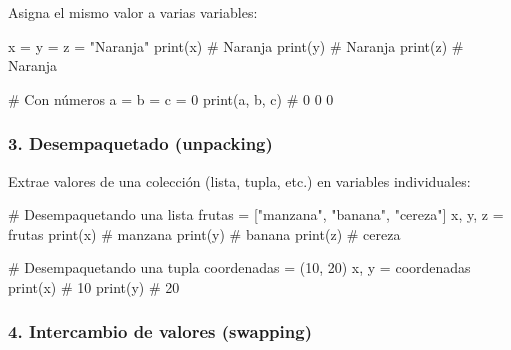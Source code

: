 \documentclass[
  doc,
  floatsintext,
  longtable,
  a4paper,
  nolmodern,
  notxfonts,
  notimes,
  12pt,
  colorlinks=true,linkcolor=blue,citecolor=blue,urlcolor=blue]{apa7}
\newenvironment{Shaded}{\begin{snugshade}}{\end{snugshade}}
\newcommand{\BuiltInTok}[1]{\textcolor[rgb]{0.00,0.23,0.31}{#1}}
\newcommand{\CommentTok}[1]{\textcolor[rgb]{0.37,0.37,0.37}{#1}}
\newcommand{\DecValTok}[1]{\textcolor[rgb]{0.68,0.00,0.00}{#1}}
\newcommand{\NormalTok}[1]{\textcolor[rgb]{0.00,0.23,0.31}{#1}}
\newcommand{\OperatorTok}[1]{\textcolor[rgb]{0.37,0.37,0.37}{#1}}
\newcommand{\StringTok}[1]{\textcolor[rgb]{0.13,0.47,0.30}{#1}}
\begin{document}
Asigna el mismo valor a varias variables:

\begin{Shaded}
\begin{Highlighting}[]
\NormalTok{x }\OperatorTok{=}\NormalTok{ y }\OperatorTok{=}\NormalTok{ z }\OperatorTok{=} \StringTok{"Naranja"}
\BuiltInTok{print}\NormalTok{(x)  }\CommentTok{\# Naranja}
\BuiltInTok{print}\NormalTok{(y)  }\CommentTok{\# Naranja}
\BuiltInTok{print}\NormalTok{(z)  }\CommentTok{\# Naranja}

\CommentTok{\# Con números}
\NormalTok{a }\OperatorTok{=}\NormalTok{ b }\OperatorTok{=}\NormalTok{ c }\OperatorTok{=} \DecValTok{0}
\BuiltInTok{print}\NormalTok{(a, b, c)  }\CommentTok{\# 0 0 0}
\end{Highlighting}
\end{Shaded}

\subsubsection{3. Desempaquetado
(unpacking)}\label{desempaquetado-unpacking}

Extrae valores de una colección (lista, tupla, etc.) en variables
individuales:

\begin{Shaded}
\begin{Highlighting}[]
\CommentTok{\# Desempaquetando una lista}
\NormalTok{frutas }\OperatorTok{=}\NormalTok{ [}\StringTok{"manzana"}\NormalTok{, }\StringTok{"banana"}\NormalTok{, }\StringTok{"cereza"}\NormalTok{]}
\NormalTok{x, y, z }\OperatorTok{=}\NormalTok{ frutas}
\BuiltInTok{print}\NormalTok{(x)  }\CommentTok{\# manzana}
\BuiltInTok{print}\NormalTok{(y)  }\CommentTok{\# banana}
\BuiltInTok{print}\NormalTok{(z)  }\CommentTok{\# cereza}

\CommentTok{\# Desempaquetando una tupla}
\NormalTok{coordenadas }\OperatorTok{=}\NormalTok{ (}\DecValTok{10}\NormalTok{, }\DecValTok{20}\NormalTok{)}
\NormalTok{x, y }\OperatorTok{=}\NormalTok{ coordenadas}
\BuiltInTok{print}\NormalTok{(x)  }\CommentTok{\# 10}
\BuiltInTok{print}\NormalTok{(y)  }\CommentTok{\# 20}
\end{Highlighting}
\end{Shaded}

\subsubsection{4. Intercambio de valores
(swapping)}\label{intercambio-de-valores-swapping}
\end{document}
